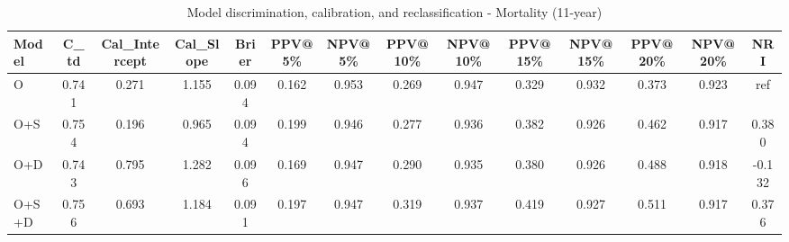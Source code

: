 \begin{table}[htbp]
\centering
\small
\caption{Model discrimination, calibration, and reclassification - Mortality (11-year)}
\label{tab:perf_mortality_11y}
\begin{tabular}{lccccccccccccc}
\toprule
Model & C\_td & Cal\_Intercept & Cal\_Slope & Brier & PPV@5\% & NPV@5\% & PPV@10\% & NPV@10\% & PPV@15\% & NPV@15\% & PPV@20\% & NPV@20\% & NRI \\
\midrule
O & 0.741 & 0.271 & 1.155 & 0.094 & 0.162 & 0.953 & 0.269 & 0.947 & 0.329 & 0.932 & 0.373 & 0.923 & ref \\
O+S & 0.754 & 0.196 & 0.965 & 0.094 & 0.199 & 0.946 & 0.277 & 0.936 & 0.382 & 0.926 & 0.462 & 0.917 & 0.380 \\
O+D & 0.743 & 0.795 & 1.282 & 0.096 & 0.169 & 0.947 & 0.290 & 0.935 & 0.380 & 0.926 & 0.488 & 0.918 & -0.132 \\
O+S+D & 0.756 & 0.693 & 1.184 & 0.091 & 0.197 & 0.947 & 0.319 & 0.937 & 0.419 & 0.927 & 0.511 & 0.917 & 0.376 \\
\bottomrule
\end{tabular}
\end{table}